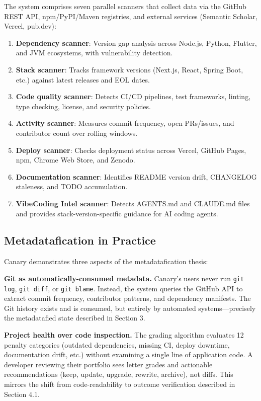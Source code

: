 \documentclass[12pt]{article}
\begin{document}
The system comprises seven parallel scanners that collect data via the GitHub REST API, npm/PyPI/Maven registries, and external services (Semantic Scholar, Vercel, pub.dev):

\begin{enumerate}
  \item \textbf{Dependency scanner}: Version gap analysis across Node.js, Python, Flutter, and JVM ecosystems, with vulnerability detection.
  \item \textbf{Stack scanner}: Tracks framework versions (Next.js, React, Spring Boot, etc.) against latest releases and EOL dates.
  \item \textbf{Code quality scanner}: Detects CI/CD pipelines, test frameworks, linting, type checking, license, and security policies.
  \item \textbf{Activity scanner}: Measures commit frequency, open PRs/issues, and contributor count over rolling windows.
  \item \textbf{Deploy scanner}: Checks deployment status across Vercel, GitHub Pages, npm, Chrome Web Store, and Zenodo.
  \item \textbf{Documentation scanner}: Identifies README version drift, CHANGELOG staleness, and TODO accumulation.
  \item \textbf{VibeCoding Intel scanner}: Detects AGENTS.md and CLAUDE.md files and provides stack-version-specific guidance for AI coding agents.
\end{enumerate}

\subsection{Metadatafication in Practice}

Canary demonstrates three aspects of the metadatafication thesis:

\textbf{Git as automatically-consumed metadata.} Canary's users never run \texttt{git log}, \texttt{git diff}, or \texttt{git blame}. Instead, the system queries the GitHub API to extract commit frequency, contributor patterns, and dependency manifests. The Git history exists and is consumed, but entirely by automated systems---precisely the metadatafied state described in Section 3.

\textbf{Project health over code inspection.} The grading algorithm evaluates 12 penalty categories (outdated dependencies, missing CI, deploy downtime, documentation drift, etc.) without examining a single line of application code. A developer reviewing their portfolio sees letter grades and actionable recommendations (keep, update, upgrade, rewrite, archive), not diffs. This mirrors the shift from code-readability to outcome verification described in Section 4.1.
\end{document}
